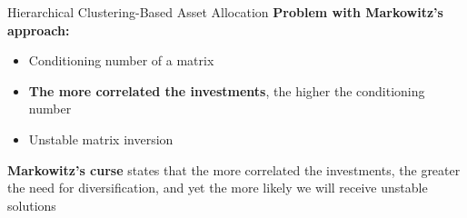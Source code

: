\begin{frame}{Hierarchical Clustering-Based Asset Allocation}
\textbf{Problem with Markowitz’s approach: }
    \begin{itemize}
            \item Conditioning number of a matrix
            \item \textbf{The more correlated the investments}, the higher the conditioning number
            \item Unstable matrix inversion
     \end{itemize}
\textbf{Markowitz’s curse} states that the more correlated the investments, the greater the need for diversification, and yet the more likely we will receive unstable solutions
   
\end{frame}


